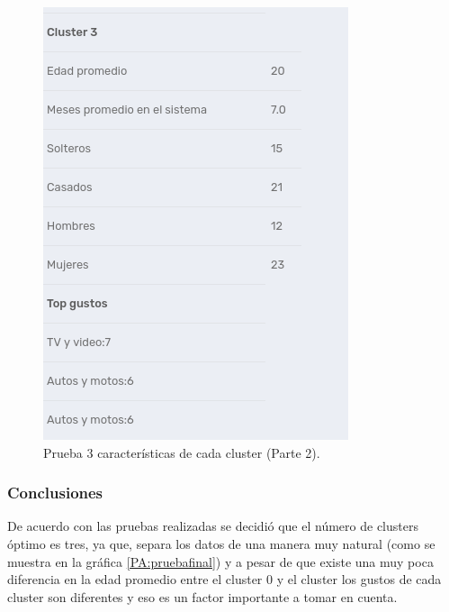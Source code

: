 \FloatBarrier
\begin{figure}[htbp!]
		\centering
			\includegraphics[width=0.4 \textwidth]{imagenes/pruebassistemarecom/cluster4_3}
		\caption{Prueba 3 características de cada cluster (Parte 2).}
\end{figure}
\FloatBarrier



\subsubsection{Conclusiones}
De acuerdo con las pruebas realizadas se decidió que el número de clusters óptimo es tres, ya que, separa los datos de una manera muy natural (como se muestra en la gráfica \ref{PA:pruebafinal}) y a pesar de que existe una muy poca diferencia en la edad promedio entre el cluster 0 y el cluster los gustos de cada cluster son diferentes y eso es un factor importante a tomar en cuenta.